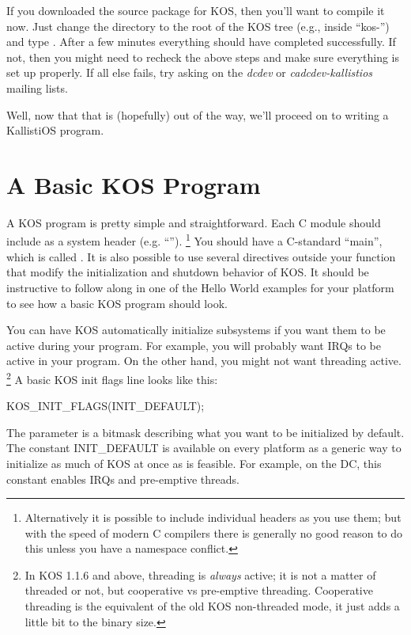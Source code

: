 \documentclass[english]{report}
\newenvironment{lyxcode}
   {\begin{list}{}{
     \setlength{\rightmargin}{\leftmargin}
     \raggedright
     \setlength{\itemsep}{0pt}
     \setlength{\parsep}{0pt}
     \normalfont\ttfamily}%
    \item[]}
   {\end{list}}
\begin{document}
If you downloaded the source package for KOS, then you'll want to
compile it now. Just change the directory to the root of the KOS tree
(e.g., inside ``kos-\kosversion'') and type . After a few
minutes everything should have completed successfully. If not, then
you might need to recheck the above steps and make sure everything
is set up properly. If all else fails, try asking on the \emph{dcdev}
or \emph{cadcdev-kallistios} mailing lists.

Well, now that that is (hopefully) out of the way, we'll proceed on
to writing a KallistiOS program.



\chapter{A Basic KOS Program}

A KOS program is pretty simple and straightforward. Each C module
should include  as a system header (e.g. ``'').%
%
\footnote{Alternatively it is possible to include individual headers as you
use them; but with the speed of modern C compilers there is generally
no good reason to do this unless you have a namespace conflict.
}
%
You should have a C-standard ``main'', which is called
. It is also possible to use several directives outside
your  function that modify the initialization and shutdown
behavior of KOS. It should be instructive to follow along in one of
the Hello World examples for your platform to see how a basic KOS
program should look.

You can have KOS automatically initialize subsystems if you want them
to be active during your program. For example, you will probably want
IRQs to be active in your program. On the other hand, you might not
want threading active.%
%
\footnote{In KOS 1.1.6 and above, threading is \emph{always} active; it is
not a matter of threaded or not, but cooperative vs pre-emptive threading.
Cooperative threading is the equivalent of the old KOS non-threaded
mode, it just adds a little bit to the binary size.
}
%
A basic KOS init flags line looks like this:

\begin{lyxcode}
KOS\_INIT\_FLAGS(INIT\_DEFAULT);
\end{lyxcode}

The parameter is a bitmask describing what you want to be initialized
by default. The constant INIT\_DEFAULT is available on every platform
as a generic way to initialize as much of KOS at once as is feasible.
For example, on the DC, this constant enables IRQs and pre-emptive
threads.
\end{document}
